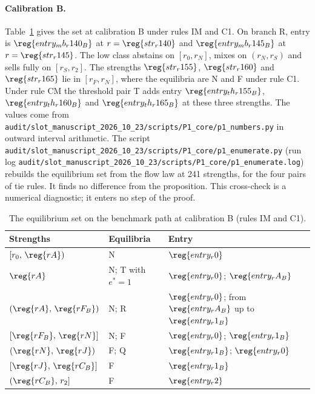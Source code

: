 \paragraph{Calibration B.}
Table~\ref{tab:a4-set} gives the set at calibration B under rules IM and C1. On branch R, entry is
\(\reg{entry_mb_r140_B}\) at \(r=\reg{str_r140}\) and \(\reg{entry_mb_r145_B}\) at \(r=\reg{str_r145}\). The low class abstains on
\([r_0,r_N]\), mixes on \((r_N,r_S)\) and sells fully on \([r_S,r_2]\). The strengths \(\reg{str_r155}\), \(\reg{str_r160}\) and
\(\reg{str_r165}\) lie in \([r_F,r_N]\), where the equilibria are N and F under rule C1. Under rule CM the threshold pair T
adds entry \(\reg{entry_th_r155_B}\), \(\reg{entry_th_r160_B}\) and \(\reg{entry_th_r165_B}\) at these three
strengths. The values come from \nolinkurl{audit/slot_manuscript_2026_10_23/scripts/P1_core/p1_numbers.py} in
outward interval arithmetic. The script
\nolinkurl{audit/slot_manuscript_2026_10_23/scripts/P1_core/p1_enumerate.py} (run log
\nolinkurl{audit/slot_manuscript_2026_10_23/scripts/P1_core/p1_enumerate.log}) rebuilds the equilibrium set from
the flow law at 241 strengths, for the four pairs of tie rules. It finds no difference from the proposition. This
cross-check is a numerical diagnostic; it enters no step of the proof.

\begin{table}[ht]
\centering
\caption{The equilibrium set on the benchmark path at calibration B (rules IM and C1).}\label{tab:a4-set}
\small
\begin{tabular}{@{}lll@{}}
\toprule
Strengths & Equilibria & Entry\\
\midrule
\([r_0,\,\reg{rA})\) & N & \(\reg{entry_r0}\)\\
\(\reg{rA}\) & N; T with \(e^*=1\) & \(\reg{entry_r0}\); \(\reg{entry_rA_B}\)\\
\((\reg{rA},\,\reg{rF_B})\) & N; R & \(\reg{entry_r0}\); from \(\reg{entry_rA_B}\) up to \(\reg{entry_r1_B}\)\\
\([\reg{rF_B},\,\reg{rN}]\) & N; F & \(\reg{entry_r0}\); \(\reg{entry_r1_B}\)\\
\((\reg{rN},\,\reg{rJ})\) & F; Q & \(\reg{entry_r1_B}\); \(\reg{entry_r0}\)\\
\([\reg{rJ},\,\reg{rC_B}]\) & F & \(\reg{entry_r1_B}\)\\
\((\reg{rC_B},\,r_2]\) & F & \(\reg{entry_r2}\)\\
\bottomrule
\end{tabular}
\end{table}

